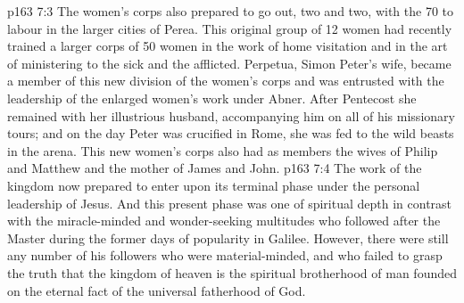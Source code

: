 \vs p163 7:3 The women’s corps also prepared to go out, two and two, with the 70 to labour in the larger cities of Perea. This original group of 12 women had recently trained a larger corps of 50 women in the work of home visitation and in the art of ministering to the sick and the afflicted. Perpetua, Simon Peter’s wife, became a member of this new division of the women’s corps and was entrusted with the leadership of the enlarged women’s work under Abner. After Pentecost she remained with her illustrious husband, accompanying him on all of his missionary tours; and on the day Peter was crucified in Rome, she was fed to the wild beasts in the arena. This new women’s corps also had as members the wives of Philip and Matthew and the mother of James and John.
\vs p163 7:4 The work of the kingdom now prepared to enter upon its terminal phase under the personal leadership of Jesus. And this present phase was one of spiritual depth in contrast with the miracle\hyp{}minded and wonder\hyp{}seeking multitudes who followed after the Master during the former days of popularity in Galilee. However, there were still any number of his followers who were material\hyp{}minded, and who failed to grasp the truth that the kingdom of heaven is the spiritual brotherhood of man founded on the eternal fact of the universal fatherhood of God.
\quizlink
